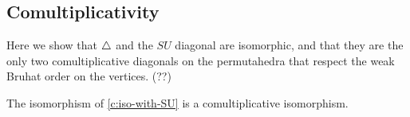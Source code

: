 



\subsection{Comultiplicativity}


Here we show that $\triangle$ and the $SU$ diagonal are isomorphic, and that they are the only two comultiplicative diagonals on the permutahedra that respect the weak Bruhat order on the vertices. (??)

The isomorphism of \cref{c:iso-with-SU} is a comultiplicative isomorphism.